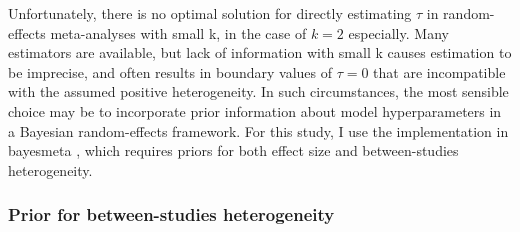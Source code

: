 Unfortunately, there is no optimal solution for directly estimating $\tau$ in random-effects meta-analyses with small k\autocite{bender2018MethodsEvidenceSynthesis}, in the case of $k=2$ especially\autocite{gonnermann2015NoSolutionCombining}.
Many estimators are available\autocite{veroniki2016MethodsEstimateBetweenstudy}, but lack of information with small k causes estimation to be imprecise, and often results in boundary values of $\tau = 0$ that are incompatible with the assumed positive heterogeneity\autocite{chung2013NondegeneratePenalizedLikelihood,friede2017MetaanalysisFewSmall}.
In such circumstances, the most sensible choice may be to incorporate prior information about model hyperparameters in a Bayesian random-effects framework\autocite{chung2013NondegeneratePenalizedLikelihood,veroniki2016MethodsEstimateBetweenstudy,friede2017MetaanalysisFewSmall,seide2019LikelihoodbasedRandomeffectsMetaanalysis}.
For this study, I use the implementation in bayesmeta \autocite{rover2017BayesianRandomeffectsMetaanalysis}, which requires priors for both effect size and between-studies heterogeneity.

\subsubsection{Prior for between-studies heterogeneity}

